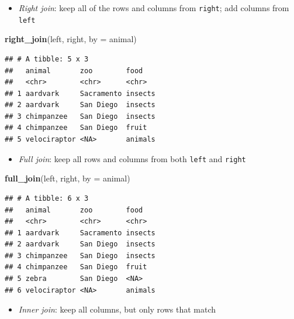 \documentclass[
]{article}
\newenvironment{Shaded}{\begin{snugshade}}{\end{snugshade}}
\newcommand{\DataTypeTok}[1]{\textcolor[rgb]{0.13,0.29,0.53}{#1}}
\newcommand{\KeywordTok}[1]{\textcolor[rgb]{0.13,0.29,0.53}{\textbf{#1}}}
\newcommand{\NormalTok}[1]{#1}
\newcommand{\StringTok}[1]{\textcolor[rgb]{0.31,0.60,0.02}{#1}}
\providecommand{\tightlist}{%
  \setlength{\itemsep}{0pt}\setlength{\parskip}{0pt}}
\begin{document}
\begin{itemize}
\tightlist
\item
  \emph{Right join}: keep all of the rows and columns from \texttt{right}; add columns from \texttt{left}
\end{itemize}

\begin{Shaded}
\begin{Highlighting}[]
\KeywordTok{right\_join}\NormalTok{(left, right, }\DataTypeTok{by =} \StringTok{\textquotesingle{}animal\textquotesingle{}}\NormalTok{)}
\end{Highlighting}
\end{Shaded}

\begin{verbatim}
## # A tibble: 5 x 3
##   animal       zoo        food   
##   <chr>        <chr>      <chr>  
## 1 aardvark     Sacramento insects
## 2 aardvark     San Diego  insects
## 3 chimpanzee   San Diego  insects
## 4 chimpanzee   San Diego  fruit  
## 5 velociraptor <NA>       animals
\end{verbatim}

\begin{itemize}
\tightlist
\item
  \emph{Full join}: keep all rows and columns from both \texttt{left} and \texttt{right}
\end{itemize}

\begin{Shaded}
\begin{Highlighting}[]
\KeywordTok{full\_join}\NormalTok{(left, right, }\DataTypeTok{by =} \StringTok{\textquotesingle{}animal\textquotesingle{}}\NormalTok{)}
\end{Highlighting}
\end{Shaded}

\begin{verbatim}
## # A tibble: 6 x 3
##   animal       zoo        food   
##   <chr>        <chr>      <chr>  
## 1 aardvark     Sacramento insects
## 2 aardvark     San Diego  insects
## 3 chimpanzee   San Diego  insects
## 4 chimpanzee   San Diego  fruit  
## 5 zebra        San Diego  <NA>   
## 6 velociraptor <NA>       animals
\end{verbatim}

\begin{itemize}
\tightlist
\item
  \emph{Inner join}: keep all columns, but only rows that match
\end{itemize}
\end{document}
